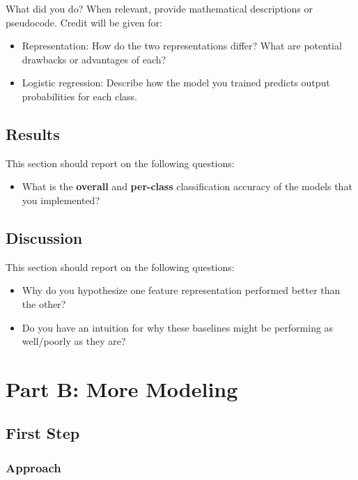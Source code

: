 \documentclass[11pt]{article}
\begin{document}
What did you do? When relevant, provide mathematical descriptions or pseudocode. Credit will be given for:

  \begin{itemize}
  \item Representation: How do the two representations differ? What are potential drawbacks or advantages of each?
  \item Logistic regression: Describe how the model you trained predicts output probabilities for each class.

  \end{itemize}

\subsection{Results}

This section should report on the following questions: 

\begin{itemize}
\item  What is the \textbf{overall} and \textbf{per-class} classification accuracy of the models that you implemented?
\end{itemize}

\subsection{Discussion}

This section should report on the following questions: 

\begin{itemize}
  \item Why do you hypothesize one feature representation performed better than the other?  
  \item Do you have an intuition for why these baselines might be performing as well/poorly as they are?
  \end{itemize}

\section{Part B: More Modeling}

\subsection{First Step}

\subsubsection{Approach}
\end{document}
